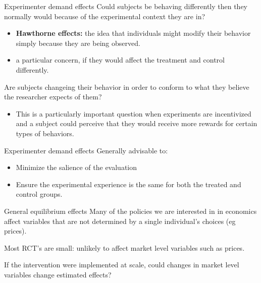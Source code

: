 \documentclass[
  ignorenonframetext,
]{beamer}
\providecommand{\tightlist}{%
  \setlength{\itemsep}{0pt}\setlength{\parskip}{0pt}}
\begin{document}
\begin{frame}{Experimenter demand effects}
\protect\hypertarget{experimenter-demand-effects}{}
Could subjects be behaving differently then they normally would because
of the experimental context they are in?

\begin{itemize}
\item
  \textbf{Hawthorne effects:} the idea that individuals might modify
  their behavior simply because they are being observed.
\item
  a particular concern, if they would affect the treatment and control
  differently.
\end{itemize}

Are subjects changeing their behavior in order to conform to what they
believe the researcher expects of them?

\begin{itemize}
\tightlist
\item
  This is a particularly important question when experiments are
  incentivized and a subject could perceive that they would receive more
  rewards for certain types of behaviors.
\end{itemize}
\end{frame}

\begin{frame}{Experimenter demand effects}
\protect\hypertarget{experimenter-demand-effects-1}{}
Generally advisable to:

\begin{itemize}
\item
  Minimize the salience of the evaluation
\item
  Ensure the experimental experience is the same for both the treated
  and control groups.
\end{itemize}
\end{frame}

\begin{frame}{General equilibrium effects}
\protect\hypertarget{general-equilibrium-effects}{}
Many of the policies we are interested in in economics affect variables
that are not determined by a single individual's choices (eg prices).

Most RCT's are small: unlikely to affect market level variables such as
prices.

If the intervention were implemented at scale, could changes in market
level variables change estimated effects?
\end{frame}
\end{document}
